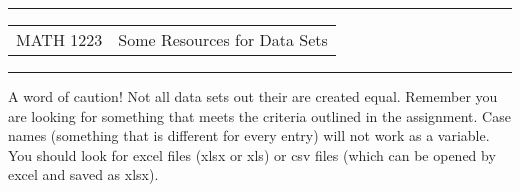 \documentclass[11pt]{article}
\begin{document}
\newcommand{\dsp}{\displaystyle}
\newcommand{\ihat}{{\bf{i}}}
\newcommand{\jhat}{{\bf{j}}}
\newcommand{\khat}{{\bf{k}}}
\newcommand{\Fhat}{{\bf{F}}}

\thispagestyle{empty}

\noindent
\sffamily
\begin{center}
\rule{7.5in}{2pt}

\vspace{.2in}

\begin{tabular}{p{4in}p{4in}}
MATH 1223

&

Some Resources for Data Sets


\end{tabular}
\rule{7.5in}{2pt}

\vspace{.1in}

\end{center}
A word of caution!  Not all data sets out their are created equal.  Remember you are looking for something that meets the criteria outlined in the assignment.  Case names (something that is different for every entry) will not work as a variable.  You should look for excel files (xlsx or xls) or csv files (which can be opened by excel and saved as xlsx). 
\end{document}
